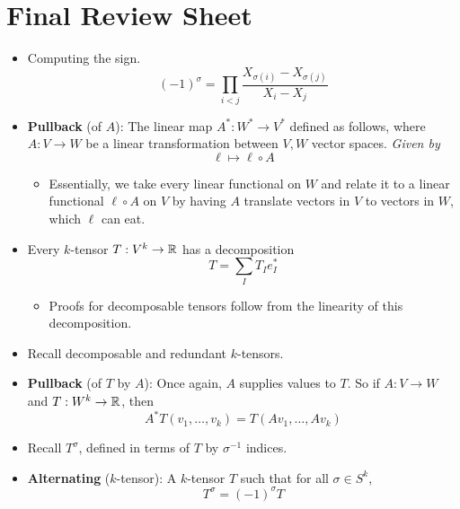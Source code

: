 \documentclass[../notes.tex]{subfiles}
\begin{document}
\section{Final Review Sheet}
\begin{itemize}
    \item {}Computing the sign.
    \begin{equation*}
        (-1)^\sigma = \prod_{i<j}\frac{X_{\sigma(i)}-X_{\sigma(j)}}{X_i-X_j}
    \end{equation*}
    \item \textbf{Pullback} (of $A$): The linear map $A^*:W^*\to V^*$ defined as follows, where $A:V\to W$ be a linear transformation between $V,W$ vector spaces. \emph{Given by}
    \begin{equation*}
        \ell \mapsto \ell\circ A
    \end{equation*}
    \begin{itemize}
        \item Essentially, we take every linear functional on $W$ and relate it to a linear functional $\ell\circ A$ on $V$ by having $A$ translate vectors in $V$ to vectors in $W$, which $\ell$ can eat.
    \end{itemize}
    \item Every $k$-tensor $T:V^k\to\mathbb{R}$ has a decomposition
    \begin{equation*}
        T = \sum_IT_Ie_I^*
    \end{equation*}
    \begin{itemize}
        \item Proofs for decomposable tensors follow from the linearity of this decomposition.
    \end{itemize}
    \item Recall decomposable and redundant $k$-tensors.
    \item \textbf{Pullback} (of $T$ by $A$): Once again, $A$ supplies values to $T$. So if $A:V\to W$ and $T:W^k\to\mathbb{R}$, then
    \begin{equation*}
        A^*T(v_1,\dots,v_k) = T(Av_1,\dots,Av_k)
    \end{equation*}
    \item Recall $T^\sigma$, defined in terms of $T$ by $\sigma^{-1}$ indices.
    \item \textbf{Alternating} ($k$-tensor): A $k$-tensor $T$ such that for all $\sigma\in S^k$,
    \begin{equation*}
        T^\sigma = (-1)^\sigma T
    \end{equation*}

\end{itemize}
\end{document}
